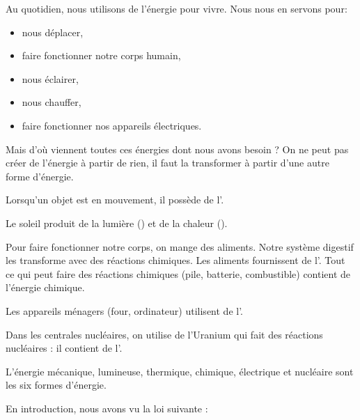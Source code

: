 \documentclass[11pt,a4paper]{article}
\begin{document}
\pagination



Au quotidien, nous utilisons de l'énergie pour vivre. Nous nous en servons pour:
\begin{itemize}
    \item nous déplacer,
    \item faire fonctionner notre corps humain,
    \item nous éclairer,
    \item nous chauffer,
    \item faire fonctionner nos appareils électriques.
\end{itemize}


Mais d'où viennent toutes ces énergies dont nous avons besoin ? On ne peut pas créer de l'énergie à partir de rien, il faut la transformer à partir d'une autre forme d'énergie.


Lorsqu'un objet est en mouvement, il possède de l’.

Le soleil produit de la lumière () et de la chaleur ().

Pour faire fonctionner notre corps, on mange des aliments. Notre système digestif les transforme avec des réactions chimiques. Les aliments fournissent de l’.
Tout ce qui peut faire des réactions chimiques (pile, batterie, combustible) contient de l’énergie chimique.

Les appareils ménagers (four, ordinateur) utilisent de l’.

Dans les centrales nucléaires, on utilise de l’Uranium qui fait des réactions nucléaires : il contient de l’.

L'énergie mécanique, lumineuse, thermique, chimique, électrique et nucléaire sont les six formes d'énergie.



En introduction, nous avons vu la loi suivante :

\vspace{15pt}
\end{document}
